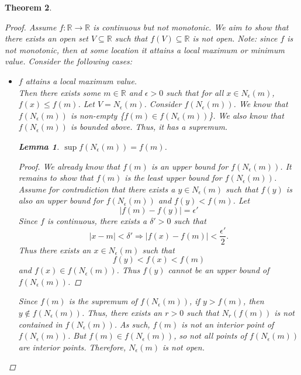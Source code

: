 \documentclass{amsart}
\newtheorem{theorem}{Theorem}
\newtheorem{lemma}[theorem]{Lemma}
\begin{document}
\begin{enumerate}[1.]
\begin{theorem}
\begin{proof}
            Assume $f: \mathbb{R} \to \mathbb{R}$ is continuous but not monotonic. We aim to show that there exists an open set 
            $V \subseteq \mathbb{R}$ such that $f(V) \subseteq \mathbb{R}$ is not open. 
            Note: since $f$ is not monotonic, then at some location it attains a local maximum or minimum value. 
            Consider the following cases:
            \begin{itemize}
                \item $f$ attains a local maximum value. \\
                Then there exists some $m \in \mathbb{R}$ and $\epsilon > 0$ such that for all $x \in N_\epsilon(m)$, $f(x) \leq f(m)$.
                Let $V = N_\epsilon(m)$. Consider $f(N_\epsilon(m))$. We know that $f(N_\epsilon(m))$ is non-empty \{$f(m) \in f(N_\epsilon(m))$\}.
                We also know that $f(N_\epsilon(m))$ is bounded above. Thus, it has a supremum. 
                \begin{lemma} $\sup f(N_\epsilon(m)) = f(m)$.
                    \begin{proof}
                    We already know that $f(m)$ is an upper bound for $f(N_\epsilon(m))$. It remains to show that 
                    $f(m)$ is the least upper bound for $f(N_\epsilon(m))$. Assume for contradiction that there exists a $y \in N_\epsilon(m)$ such that $f(y)$ is also an upper bound for $f(N_\epsilon(m))$ and $f(y) < f(m)$. 
                    Let
                    \[
                        | f(m) - f(y) | = \epsilon'     
                    \]
                    Since $f$ is continuous,  there exists a $\delta' > 0$ such that
                    \[
                        |x - m| < \delta' \Rightarrow |f(x) - f(m)| < \frac{\epsilon'}{2}.    
                    \]
                    Thus there exists an $x \in N_\epsilon(m)$ such that
                    \[
                        f(y) < f(x) < f(m)    
                    \]
                    and $f(x) \in f(N_\epsilon(m))$. Thus $f(y)$ cannot be an upper bound of $f(N_\epsilon(m))$.
                    \end{proof}
                \end{lemma}
                Since $f(m)$ is the supremum of $f(N_\epsilon(m))$, if $y > f(m)$, then $y \notin f(N_\epsilon(m))$.
                Thus, there exists an $r > 0$ such that $N_r(f(m))$ is not contained in $f(N_\epsilon(m))$. As such, 
                $f(m)$ is not an interior point of $f(N_\epsilon(m))$. But $f(m) \in f(N_\epsilon(m))$, 
                so not all points of $f(N_\epsilon(m))$ are interior points. Therefore, $N_\epsilon(m)$ is not open.


\end{itemize}
\end{proof}
\end{theorem}
\end{enumerate}
\end{document}
